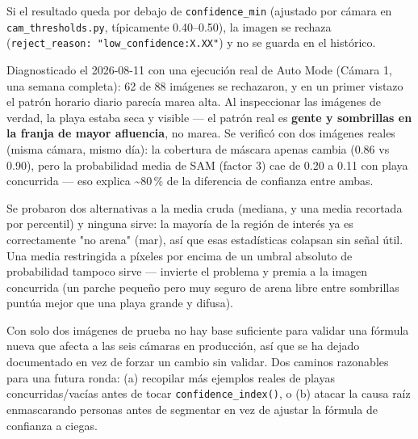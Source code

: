Si el resultado queda por debajo de \texttt{confidence\_min} (ajustado por cámara en
\texttt{cam\_thresholds.py}, típicamente 0.40--0.50), la imagen se rechaza
(\texttt{reject\_reason: "low\_confidence:X.XX"}) y no se guarda en el histórico.

\begin{infobox}
Diagnosticado el 2026-08-11 con una ejecución real de Auto Mode (Cámara 1, una semana
completa): 62 de 88 imágenes se rechazaron, y en un primer vistazo el patrón horario diario
parecía marea alta. Al inspeccionar las imágenes de verdad, la playa estaba seca y visible —
el patrón real es \textbf{gente y sombrillas en la franja de mayor afluencia}, no marea. Se
verificó con dos imágenes reales (misma cámara, mismo día): la cobertura de máscara apenas
cambia (0.86 vs 0.90), pero la probabilidad media de SAM (factor 3) cae de 0.20 a 0.11 con
playa concurrida — eso explica \textasciitilde80\,\% de la diferencia de confianza entre
ambas.

Se probaron dos alternativas a la media cruda (mediana, y una media recortada por
percentil) y ninguna sirve: la mayoría de la región de interés ya es correctamente
"no arena" (mar), así que esas estadísticas colapsan sin señal útil. Una media restringida a
píxeles por encima de un umbral absoluto de probabilidad tampoco sirve — invierte el
problema y premia a la imagen concurrida (un parche pequeño pero muy seguro de arena libre
entre sombrillas puntúa mejor que una playa grande y difusa).

Con solo dos imágenes de prueba no hay base suficiente para validar una fórmula nueva que
afecta a las seis cámaras en producción, así que se ha dejado documentado en vez de forzar un
cambio sin validar. Dos caminos razonables para una futura ronda: (a) recopilar más ejemplos
reales de playas concurridas/vacías antes de tocar \texttt{confidence\_index()}, o
(b) atacar la causa raíz enmascarando personas antes de segmentar en vez de ajustar la
fórmula de confianza a ciegas.
\end{infobox}

